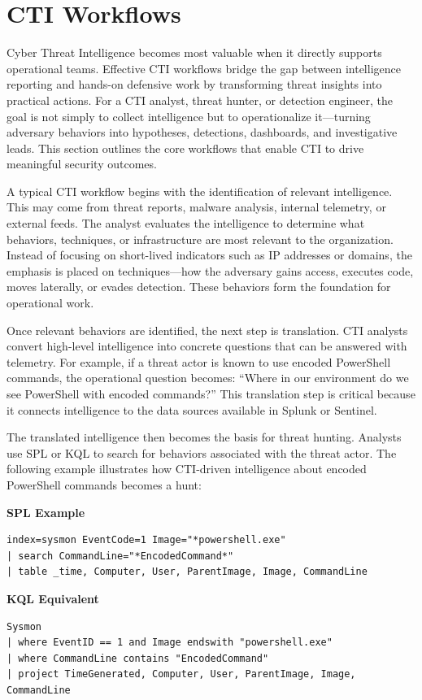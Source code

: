 \section{CTI Workflows}

Cyber Threat Intelligence becomes most valuable when it directly supports operational teams. Effective CTI workflows bridge the gap between intelligence reporting and hands-on defensive work by transforming threat insights into practical actions. For a CTI analyst, threat hunter, or detection engineer, the goal is not simply to collect intelligence but to operationalize it—turning adversary behaviors into hypotheses, detections, dashboards, and investigative leads. This section outlines the core workflows that enable CTI to drive meaningful security outcomes.

A typical CTI workflow begins with the identification of relevant intelligence. This may come from threat reports, malware analysis, internal telemetry, or external feeds. The analyst evaluates the intelligence to determine what behaviors, techniques, or infrastructure are most relevant to the organization. Instead of focusing on short-lived indicators such as IP addresses or domains, the emphasis is placed on techniques—how the adversary gains access, executes code, moves laterally, or evades detection. These behaviors form the foundation for operational work.

Once relevant behaviors are identified, the next step is translation. CTI analysts convert high-level intelligence into concrete questions that can be answered with telemetry. For example, if a threat actor is known to use encoded PowerShell commands, the operational question becomes: “Where in our environment do we see PowerShell with encoded commands?” This translation step is critical because it connects intelligence to the data sources available in Splunk or Sentinel.

The translated intelligence then becomes the basis for threat hunting. Analysts use SPL or KQL to search for behaviors associated with the threat actor. The following example illustrates how CTI-driven intelligence about encoded PowerShell commands becomes a hunt:

\textbf{SPL Example}
\begin{lstlisting}
index=sysmon EventCode=1 Image="*powershell.exe"
| search CommandLine="*EncodedCommand*"
| table _time, Computer, User, ParentImage, Image, CommandLine
\end{lstlisting}

\textbf{KQL Equivalent}
\begin{lstlisting}
Sysmon
| where EventID == 1 and Image endswith "powershell.exe"
| where CommandLine contains "EncodedCommand"
| project TimeGenerated, Computer, User, ParentImage, Image, CommandLine
\end{lstlisting}


